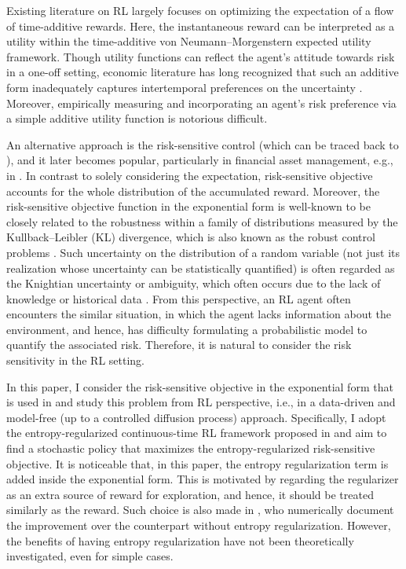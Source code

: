 Existing literature on RL largely focuses on optimizing the expectation of a flow of time-additive rewards. Here, the instantaneous reward can be interpreted as a utility within the time-additive von Neumann–Morgenstern expected utility framework. Though utility functions can reflect the agent's attitude towards risk in a one-off setting, economic literature has long recognized that such an additive form inadequately captures intertemporal preferences on the uncertainty \citep{epstein1989substitution}. Moreover, empirically measuring and incorporating an agent's risk preference via a simple additive utility function is notorious difficult.  

An alternative approach is the risk-sensitive control (which can be traced back to \citealt{jacobson1973optimal}), and it later becomes popular, particularly in financial asset management, e.g., in \citet{bielecki1999risk}. In contrast to solely considering the expectation, risk-sensitive objective accounts for the whole distribution of the accumulated reward. 
Moreover, the risk-sensitive objective function in the exponential form is well-known to be closely related to the robustness within a family of distributions measured by the Kullback–Leibler (KL) divergence, which is also known as the robust control problems \citep{hansen2001robust}. Such uncertainty on the distribution of a random variable (not just its realization whose uncertainty can be statistically quantified) is often regarded as the Knightian uncertainty or ambiguity, which often occurs due to the lack of knowledge or historical data \citep{leroy1987knight}. From this perspective, an RL agent often encounters the similar situation, in which the agent lacks information about the environment, and hence, has difficulty formulating a probabilistic model to quantify the associated risk. Therefore, it is natural to consider the risk sensitivity in the RL setting. 

In this paper, I consider the risk-sensitive objective in the exponential form that is used in \citet{bielecki1999risk} and study this problem from RL perspective, i.e., in a data-driven and model-free (up to a controlled diffusion process) approach. Specifically, I adopt the entropy-regularized continuous-time RL framework proposed in \citet{wang2020reinforcement} and aim to find a stochastic policy that maximizes the entropy-regularized risk-sensitive objective. It is noticeable that, in this paper, the entropy regularization term is added inside the exponential form. This is motivated by regarding the regularizer as an extra source of reward for exploration, and hence, it should be treated similarly as the reward. Such choice is also made in \cite{enders2024risk}, who numerically document the improvement over the counterpart without entropy regularization. However, the benefits of having entropy regularization have not been theoretically investigated, even for simple cases. 

